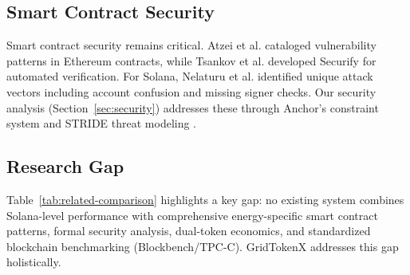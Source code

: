 \documentclass[conference]{IEEEtran}
\begin{document}
\subsection{Smart Contract Security}

Smart contract security remains critical. Atzei et al. \cite{atzei2017} cataloged vulnerability patterns in Ethereum contracts, while Tsankov et al. \cite{securify} developed Securify for automated verification. For Solana, Nelaturu et al. \cite{nelaturu2022} identified unique attack vectors including account confusion and missing signer checks. Our security analysis (Section~\ref{sec:security}) addresses these through Anchor's constraint system and STRIDE threat modeling \cite{stride}.

\subsection{Research Gap}

Table~\ref{tab:related-comparison} highlights a key gap: no existing system combines Solana-level performance with comprehensive energy-specific smart contract patterns, formal security analysis, dual-token economics, and standardized blockchain benchmarking (Blockbench/TPC-C). GridTokenX addresses this gap holistically.

\begin{table}[htbp]
\caption{Comparison with Prior Work}
\begin{center}
%
\label{tab:related-comparison}
\end{center}
\end{table}
\end{document}
